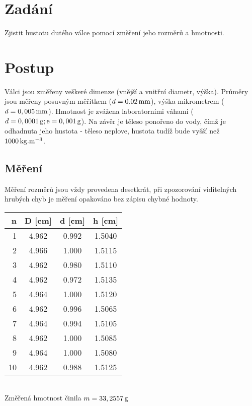 \documentclass[czech,11pt,a4paper]{article}
\begin{document}
	
	\section{Zadání}
	Zjistit hustotu dutého válce pomocí změření jeho rozměrů a hmotnosti.
	
	\section{Postup}
	Válci jsou změřeny veškeré dimenze (vnější a vnitřní diametr, výška). Průměry jsou měřeny posuvným měřítkem ($d = 0.02\,\rm mm$), výška mikrometrem ($d = 0,005\,\rm mm$). Hmotnost je zvážena laboratorními váhami ($ d = 0,0001\,\rm g ; e = 0,001\,\rm g$). Na závěr je těleso ponořeno do vody, čímž je odhadnuta jeho hustota - těleso neplove, hustota tudíž bude vyšší než $1000\,\rm {kg}.{m^{-3}}$.
	
	
	\subsection{Měření}
	Měření rozměrů jsou vždy provedena desetkrát, při zpozorování viditelných hrubých chyb je měření opakováno bez zápisu chybné hodnoty. 
	\\
	
	\quad \quad \quad\quad\quad \quad\quad\quad\quad\quad\quad\quad\quad \begin{tabular}{||r|c|c|c||}
		\hline
		n & D [cm] & d [cm] & h [cm] \\
		\hline
		1 & 4.962 & 0.992 & 1.5040 \\
		\hline
		2 & 4.966 & 1.000 &1.5115\\
		\hline
		3 & 4.962 &0.980 &1.5110 \\
		\hline
		4 & 4.962 & 0.972 &1.5135\\
		\hline
		5 &  4.964 &1.000 &1.5120\\
		\hline
		6 &  4.962 & 0.996&1.5065\\
		\hline 
		7 &  4.964 & 0.994&1.5105\\
		\hline
		8 &  4.962 &1.000 &1.5085\\
		\hline
		9 &  4.964 & 1.000&1.5080\\
		\hline
		10 &  4.962 & 0.988&1.5125\\
		\hline
	\end{tabular} \\
	

\quad \quad \quad\quad\quad \quad\quad\quad\quad\quad\quad\quad Změřená hmotnost činila $m = 33,2557\,\rm g$
	
\end{document}
